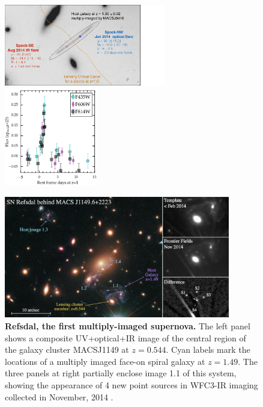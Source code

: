 \documentclass[12pt]{article}
\begin{document}
\begin{figure}
\begin{center}
\includegraphics[width=0.63\textwidth]{FIG/spock_summary}
\includegraphics[width=0.36\textwidth]{FIG/spockNW_lightcurve_jan14event2}
\caption{ \label{fig:spock} %
{\bf Spock, a peculiar pair of events.}  {\it Left:} A template
\HST\ image in the F814W band showing the locations of two transient
sources (nicknamed ``Spock-SE'' and ``Spock-NW'') that separately
appeared in adjacent images of a strongly-lensed galaxy at $z=1.0$
behind the Frontier Field cluster MACSJ0416. Lens models indicate that
a critical curve passes roughly mid-way between them, and they are
magnified by $\mu\sim20-30$ (3-4 mags).  {\it Right:} The light curve
of the Spock-NW event was captured in high-cadence HST-ACS imaging,
and the entire episode lasted only $\sim3$ rest-frame days. 
}
\vspace{3mm}
\includegraphics[width=0.88\textwidth]{FIG/refsdal_discovery.jpg}
 \caption{ %
  {\bf Refsdal, the first multiply-imaged supernova.}
   The left panel shows a composite UV+optical+IR image of the central
   region of the galaxy cluster MACSJ1149 at $z=0.544$.  Cyan labels
   mark the locations of a multiply imaged face-on spiral galaxy at
   $z=1.49$.  The three panels at
   right partially enclose image 1.1 of this system, showing the
   appearance of 4 new point sources in WFC3-IR imaging collected in
   November, 2014 \citep{Kelly:2015}.
\label{fig:refsdal}  }
\end{center}
\end{figure}
\end{document}

